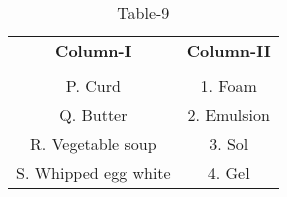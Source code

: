 \begin{table}[htbp]
  \centering
  \caption{Table-9}
  \label{table9}
  \begin{tabular}{cc}
  \textbf{Column-I} & \textbf{Column-II} \\ \\
    P. Curd & 1. Foam \\
    Q. Butter & 2. Emulsion \\
    R. Vegetable soup & 3. Sol \\
    S. Whipped egg white & 4. Gel \\
  \end{tabular}
\end{table}
